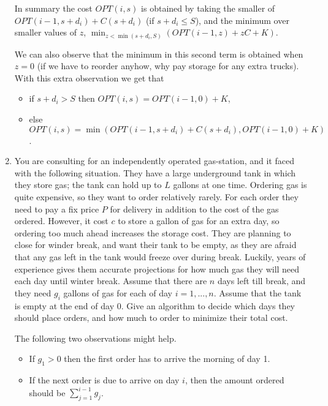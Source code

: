 \documentclass[12pt]{article}
\def\opt{{OPT}}
\def\opt{{OPT}}
\begin{document}
\begin{enumerate}
{\begin{itemize}
In summary the cost $\opt(i,s)$ is obtained by taking the smaller
of $\opt(i-1,s+d_i)+C(s+d_i)$ (if $s+d_i \le S$), and the minimum over
smaller values of $z$, $\min_{z <\min(s+d_i,S)} (\opt(i-1, z)+zC+K)$.

We can also observe that the minimum in this second term is
obtained when $z=0$ (if we have to reorder anyhow, why pay storage for
any extra trucks). With this extra observation we get that
\begin{itemize}
\item if $s+d_i>S$ then $\opt(i,s)=\opt(i-1,0)+K$,
\item else $\opt(i,s)=\min(\opt(i-1,s+d_i)+C(s+d_i), \opt(i-1,0)+K)$.
\end{itemize}
\end{itemize}

}


\item

You are consulting for an independently operated gas-station,
and it faced with the following situation.
They have a large underground tank in which they store gas;
the tank can hold up to $L$ gallons at one time.
Ordering gas is quite expensive, so they want to order relatively rarely.
For each order
they need to pay a fix price $P$ for delivery in addition to the cost
of the gas ordered. However, it cost $c$ to store a gallon of gas for an
extra day, so ordering too much ahead increases the storage cost. They are
planning to close for winder break, and want their tank to be empty, as they
are afraid that any gas left in the tank would freeze over during break.
Luckily, years of experience gives them accurate projections for
how much gas they will need each day until winter break.
Assume that there are $n$ days left till break, and
they need $g_i$ gallons of gas for each of day $i=1,...,n$. Assume that the
tank is empty at the end of day 0. Give an algorithm to decide which days
they should place orders, and how much to order to minimize their total cost.

The following two observations might help.
\begin{itemize}
\item If $g_1 >0$ then the first
order has to arrive the morning of day 1.
\item If the next order is due to
arrive on day $i$, then the amount ordered should be $\sum_{j=1}^{i-1}g_j$.
\end{itemize}



\end{enumerate}
\end{document}
